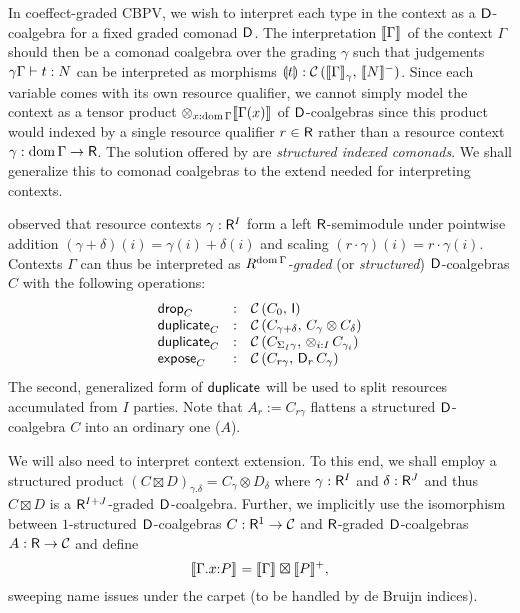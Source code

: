 \documentclass[acmsmall,review,anonymous]{acmart}\settopmatter{printfolios=true,printccs=false,printacmref=false}
\begin{document}
In coeffect-graded CBPV, we wish to interpret each type in the context
as a $\D$-coalgebra for a fixed graded comonad $\D$.  The
interpretation $\den \Gamma$ of the context $\Gamma$ should then be a
comonad coalgebra over the grading $\gamma$ such that judgements
$\qCompTy \gamma \Gamma t N$ can be interpreted as morphisms
$\dent t : \Hom {\Den\Gamma \gamma} {\denn N}$.  Since each variable
comes with its own resource qualifier, we cannot simply model the
context as a tensor product $\tupt {x:\dom\Gamma} \den{\Gamma(x)}$ of
$\D$-coalgebras since this product would indexed by a single resource
qualifier $r \in \R$ rather than a resource context
$\gamma : \dom\Gamma \to \R$.  The solution offered by
\citet{orchard:icfp14} are \emph{structured indexed comonads}.  We
shall generalize this to comonad coalgebras to the extend needed for
interpreting contexts.

\citet{mcBride:wadler60} observed that resource contexts
$\gamma : \R^I$ form a left $\R$-semimodule under pointwise addition
$(\gamma + \delta)(i) = \gamma(i) + \delta(i)$ and scaling
$(r \cdot \gamma)(i) = r \cdot \gamma(i)$.  Contexts $\Gamma$ can thus
be interpreted as \emph{$R^{\dom \Gamma}$-graded}
(or \emph{structured}) $\D$-coalgebras $C$ with
the following operations:
\[
\begin{array}{lcl}
  \tdrop[C]     & : & \Hom {C_0} {\I} \\
  \duplicate[C] & : & \Hom {C_{\gamma+\delta}} {C_\gamma \otimes C_\delta} \\
  \duplicate[C] & : & \Hom {C_{\sumt I \gamma}} {\tupt {i:I} C_{\gamma_i}} \\
  \expose[C]    & : & \Hom {C_{r\gamma}} {\D[r]\,C_\gamma} \\
\end{array}
\]
The second, generalized form of $\tduplicate$ will be used to split
resources accumulated from $I$ parties.  Note that
$A_r := C_{r\gamma}$ flattens a structured $\D$-coalgebra $C$ into an
ordinary one ($A$).

We will also need to interpret context extension.  To this end, we
shall employ a structured product
$(C \boxtimes D)_{\gamma.\delta} = C_\gamma \otimes D_\delta$ where
$\gamma : \R^I$ and $\delta : \R^J$ and thus $C \boxtimes D$ is a
$\R^{I+J}$-graded $\D$-coalgebra.  Further, we implicitly use the
isomorphism between $1$-structured $\D$-coalgebras $C : \R^1 \to \CC$
and $\R$-graded $\D$-coalgebras $A : \R \to \CC$ and define
\[
\den{\ext \Gamma x P}
  = \den \Gamma \boxtimes \denp P
  ,
\]
sweeping name issues under the carpet (to be handled by de Bruijn indices).
\end{document}
